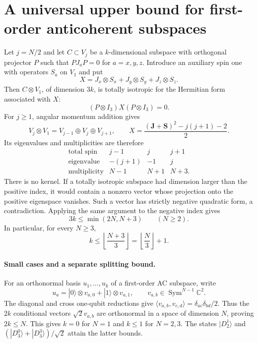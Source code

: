 \documentclass[11pt]{article}
\begin{document}
\section*{A universal upper bound for first-order anticoherent subspaces}
Let $j=N/2$ and let $C\subset V_j$ be a $k$-dimensional subspace with
orthogonal projector $P$ such that $PJ_aP=0$ for $a=x,y,z$.
Introduce an auxiliary spin one with operators $S_a$ on $V_1$ and put
\[
 X=J_x\otimes S_x+J_y\otimes S_y+J_z\otimes S_z.
\]
Then $C\otimes V_1$, of dimension $3k$, is totally isotropic for the
Hermitian form associated with $X$:
\[
 (P\otimes I_3)X(P\otimes I_3)=0.
\]
For $j\ge1$, angular momentum addition gives
\[
 V_j\otimes V_1=V_{j-1}\oplus V_j\oplus V_{j+1},\qquad
 X=\frac{(\mathbf J+\mathbf S)^2-j(j+1)-2}{2}.
\]
Its eigenvalues and multiplicities are therefore
\[
\begin{array}{c|ccc}
 \text{total spin}&j-1&j&j+1\\ \hline
 \text{eigenvalue}&-(j+1)&-1&j\\
 \text{multiplicity}&N-1&N+1&N+3.
\end{array}
\]
There is no kernel. If a totally isotropic subspace had dimension larger
than the positive index, it would contain a nonzero vector whose projection
onto the positive eigenspace vanishes. Such a vector has strictly negative
quadratic form, a contradiction. Applying the same argument to the negative
index gives
\[
 \boxed{3k\le\min(2N,N+3)\qquad(N\ge2).}
\]
In particular, for every $N\ge3$,
\[
 \boxed{k\le\left\lfloor\frac{N+3}{3}\right\rfloor
      =\left\lfloor\frac N3\right\rfloor+1.}
\]
\paragraph{Small cases and a separate splitting bound.}
For an orthonormal basis $u_1,\ldots,u_k$ of a first-order AC subspace, write
\[
 u_a=|0\rangle\otimes v_{a,0}+|1\rangle\otimes v_{a,1},
 \qquad v_{a,b}\in\operatorname{Sym}^{N-1}\mathbb C^2.
\]
The diagonal and cross one-qubit reductions give
$\langle v_{a,b},v_{c,d}\rangle=\delta_{ac}\delta_{bd}/2$.
Thus the $2k$ conditional vectors $\sqrt2v_{a,b}$ are orthonormal in a
space of dimension $N$, proving $2k\le N$. This gives $k=0$ for $N=1$
and $k\le1$ for $N=2,3$. The states $|D_2^1\rangle$ and
$(|D_3^0\rangle+|D_3^3\rangle)/\sqrt2$ attain the latter bounds.
\end{document}
